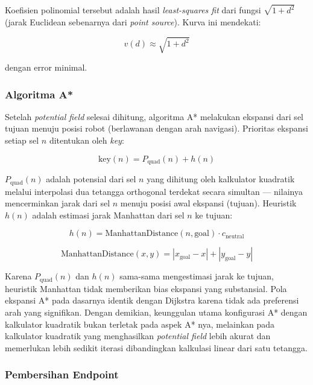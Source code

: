 Koefisien polinomial tersebut adalah hasil \emph{least-squares fit}
dari fungsi $\sqrt{1 + d^2}$ (jarak Euclidean sebenarnya dari
\emph{point source}). Kurva ini mendekati:

\begin{equation}
v(d) \approx \sqrt{1 + d^2}
\end{equation}

dengan error minimal.

\subsubsection{Algoritma A*}

Setelah \emph{potential field} selesai dihitung, algoritma A*
melakukan ekspansi dari sel tujuan menuju posisi robot
(berlawanan dengan arah navigasi). Prioritas ekspansi setiap sel $n$
ditentukan oleh \emph{key}:

\begin{equation}
\text{key}(n) = P_{\text{quad}}(n) + h(n)
\end{equation}

$P_{\text{quad}}(n)$ adalah potensial dari sel $n$ yang dihitung
oleh kalkulator kuadratik melalui interpolasi dua tetangga
orthogonal terdekat secara simultan — nilainya mencerminkan jarak
dari sel $n$ menuju posisi awal ekspansi (tujuan). Heuristik $h(n)$
adalah estimasi jarak Manhattan dari sel $n$ ke tujuan:

\begin{equation}
h(n) = \text{ManhattanDistance}(n, \text{goal}) \cdot
c_{\text{neutral}}
\end{equation}

\begin{equation}
\text{ManhattanDistance}(x, y) = |x_{\text{goal}} - x|
+ |y_{\text{goal}} - y|
\end{equation}

Karena $P_{\text{quad}}(n)$ dan $h(n)$ sama-sama mengestimasi jarak
ke tujuan, heuristik Manhattan tidak memberikan bias ekspansi yang
substansial. Pola ekspansi A* pada dasarnya identik
dengan Dijkstra karena tidak ada preferensi arah yang signifikan.
Dengan demikian, keunggulan utama konfigurasi
A* dengan kalkulator kuadratik bukan terletak pada
aspek A* nya, melainkan pada kalkulator kuadratik yang
menghasilkan \emph{potential field} lebih akurat dan memerlukan lebih sedikit iterasi dibandingkan kalkulasi linear dari satu tetangga.

\subsubsection{Pembersihan Endpoint}

